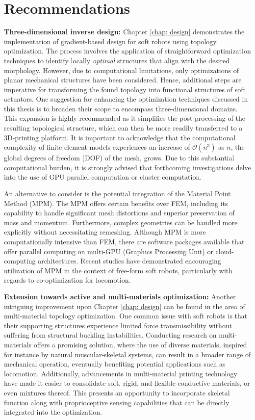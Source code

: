 \section[Recommendations]{Recommendations}
\textbf{Three-dimensional inverse design:}  Chapter \ref{chap: design} demonstrates the implementation of gradient-based design for soft robots using topology optimization. The process involves the application of straightforward optimization techniques to identify locally \textit{optimal} structures that align with the desired morphology. However, due to computational limitations, only optimizations of planar mechanical structures have been considered. Hence, additional steps are imperative for transforming the found topology into functional structures of soft actuators. One suggestion for enhancing the optimization techniques discussed in this thesis is to broaden their scope to encompass three-dimensional domains. This expansion is highly recommended as it simplifies the post-processing of the resulting topological structure, which can then be more readily transferred to a 3D-printing platform. It is important to acknowledge that the computational complexity of finite element models experiences an increase of $\mathcal{O}(n^3)$ as $n$, the global degrees of freedom (DOF) of the mesh, grows. Due to this substantial computational burden, it is strongly advised that forthcoming investigations delve into the use of GPU parallel computation or cluster computation.

An alternative to consider is the potential integration of the Material Point Method (MPM). The MPM offers certain benefits over FEM, including its capability to handle significant mesh distortions and superior preservation of mass and momentum. Furthermore, complex geometries can be handled more explicitly without necessitating remeshing. Although MPM is more computationally intensive than FEM, there are software packages available that offer parallel computing on multi-GPU (Graphics Processing Unit) or cloud-computing architectures. Recent studies have demonstrated encouraging utilization of MPM in the context of free-form soft robots, particularly with regards to co-optimization for locomotion. \vspace{1mm}

\textbf{Extension towards active and multi-materials optimization:} Another intriguing improvement upon Chapter \ref{chap: design} can be found in the area of multi-material topology optimization. One common issue with soft robots is that their supporting structures experience limited force transmissibility without suffering from structural buckling instabilities. Conducting research on multi-materials offers a promising solution, where the use of diverse materials, inspired for instance by natural muscular-skeletal systems, can result in a broader range of mechanical operation, eventually benefiting potential applications such as locomotion. Additionally, advancements in multi-material printing technology have made it easier to consolidate soft, rigid, and flexible conductive materials, or even mixtures thereof. This presents an opportunity to incorporate skeletal function along with proprioceptive sensing capabilities that can be directly integrated into the optimization.


